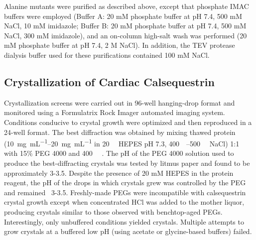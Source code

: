 Alanine mutants were purified as described above, except that phosphate IMAC buffers were employed (Buffer A: 20 mM phosphate buffer at pH 7.4, 500 mM NaCl, 10 mM imidazole; Buffer B: 20 mM phosphate buffer at pH 7.4, 500 mM NaCl, 300 mM imidazole), and an on-column high-salt wash was performed (20 mM phosphate buffer at pH 7.4, 2 M NaCl). In addition, the TEV protease dialysis buffer used for these purifications contained 100 mM NaCl.

\subsection*{Crystallization of Cardiac Calsequestrin}
Crystallization screens were carried out in 96-well hanging-drop format and monitored using a Formulatrix Rock Imager automated imaging system. Conditions conducive to crystal growth were optimized and then reproduced in a 24-well format. The best diffraction was obtained by mixing thawed protein (\SIrange[range-units = single]{10}{20}{\mg\per\milli\liter} in \SI{20}{\milli\Molar} HEPES pH 7.3, \SIrange[range-units = single]{400}{500}{\milli\Molar} NaCl) 1:1 with 15\% PEG 4000 and \SI{400}{\milli\Molar} . The pH of the PEG 4000 solution used to produce the best-diffracting crystals was tested by litmus paper and found to be approximately 3-3.5. Despite the presence of 20 mM HEPES in the protein reagent, the pH of the drops in which crystals grew was controlled by the PEG and remained ~3-3.5. Freshly-made PEGs were incompatible with calsequestrin crystal growth except when concentrated HCl was added to the mother liquor, producing crystals similar to those observed with benchtop-aged PEGs. Interestingly, only unbuffered conditions yielded crystals. Multiple attempts to grow crystals at a buffered low pH (using acetate or glycine-based buffers) failed.


